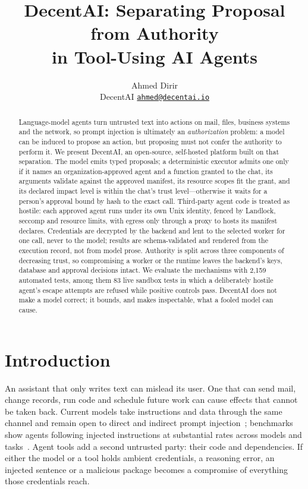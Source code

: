 \documentclass[10pt,twocolumn,a4paper]{article}
\title{\vspace{-1.2em}\Large\bfseries\color{accent}
  DecentAI: Separating Proposal from Authority\\in Tool-Using AI Agents}
\author{\normalsize Ahmed Dirir\\[0.1em]
  \small DecentAI \quad \href{mailto:ahmed@decentai.io}{\texttt{ahmed@decentai.io}}}
\date{}
\newcommand{\sys}{DecentAI}
\begin{document}
\maketitle
\vspace{-1.5em}

\begin{abstract}
Language-model agents turn untrusted text into actions on mail, files,
business systems and the network, so prompt injection is ultimately an
\emph{authorization} problem: a model can be induced to propose an
action, but proposing must not confer the authority to perform it. We
present \sys{}, an open-source, self-hosted platform built on that
separation. The model emits typed proposals; a deterministic executor
admits one only if it names an organization-approved agent and a
function granted to the chat, its arguments validate against the
approved manifest, its resource scopes fit the grant, and its declared
impact level is within the chat's trust level---otherwise it waits for
a person's approval bound by hash to the exact call. Third-party agent
code is treated as hostile: each approved agent runs under its own Unix
identity, fenced by Landlock, seccomp and resource limits, with egress
only through a proxy to hosts its manifest declares. Credentials are
decrypted by the backend and lent to the selected worker for one call,
never to the model; results are schema-validated and rendered from the
execution record, not from model prose. Authority is split across
three components of decreasing trust, so compromising a worker or the
runtime leaves the backend's keys, database and approval decisions
intact. We evaluate the mechanisms with 2{,}159 automated tests,
among them 83 live sandbox tests in which a deliberately hostile agent's
escape attempts are refused while positive controls pass. \sys{} does not make a model correct; it
bounds, and makes inspectable, what a fooled model can cause.
\end{abstract}

\section{Introduction}

An assistant that only writes text can mislead its user. One that can
send mail, change records, run code and schedule future work can cause
effects that cannot be taken back. Current models take instructions and
data through the same channel and remain open to direct and indirect
prompt injection~\cite{perez2022ignore,greshake2023indirect}; benchmarks
show agents following injected instructions at substantial rates across
models and tasks~\cite{zhan2024injecagent,debenedetti2024agentdojo}.
Agent tools add a second untrusted party: their code and dependencies.
If either the model or a tool holds ambient credentials, a reasoning
error, an injected sentence or a malicious package becomes a
compromise of everything those credentials reach.
\end{document}
